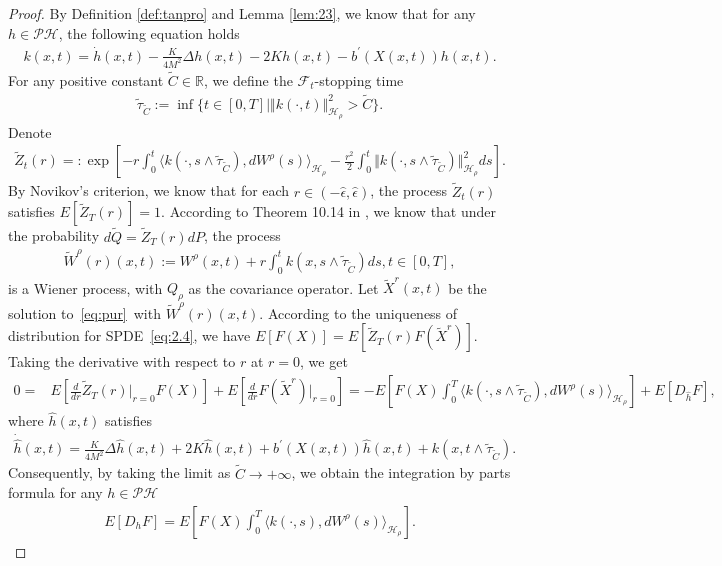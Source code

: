 \documentclass[11pt]{article}
\numberwithin{equation}{section}%
\numberwithin{figure}{section}%
\theoremstyle{remark}
\begin{document}
	\begin{proof}
		By Definition \ref{def:tanpro} and Lemma \ref{lem:23}, we know that for any $h\in\mathcal{PH}$, the following equation holds
		\begin{align*}
			k(x,t)=\dot{h}(x,t)-\frac{K}{4M^{2}}\Delta h(x,t)-2K h(x,t) -b^{\prime}(X(x,t))h(x,t).
		\end{align*}
		For any positive constant  $\tilde{C}\in\mathbb{R}$, we define the $\mathcal{F}_{t}$-stopping time
	\begin{align*}
		\tilde{\tau}_{\tilde{C}}:=\inf\{t\in[0,T]\mid\Vert k(\cdot,t)\Vert_{\mathcal{H}_{\rho}}^{2}> \tilde{C} \}.
	\end{align*}
	Denote 
	\begin{align*}
		\tilde{Z}_{t}(r)=:\exp\left[-r\int_{0}^{t}\langle k(\cdot,s\wedge\tilde{\tau}_{\tilde{C}}),dW^{\rho}(s)\rangle_{\mathcal{H}_{\rho}}-\frac{r^{2}}{2}\int_{0}^{t}\Vert k(\cdot,s\wedge\tilde{\tau}_{\tilde{C}})\Vert^{2}_{\mathcal{H}_{\rho}}ds\right].
	\end{align*}
	By Novikov’s criterion, we know that for each $r\in(-\hat{\epsilon},\hat{\epsilon})$, the process $\tilde{Z}_{t}(r)$ satisfies $E[\tilde{Z}_{T}(r)]=1$. According to Theorem 10.14 in \cite{Da2014book}, we know that under the probability $d\tilde{Q}=\tilde{Z}_{T}(r)dP$,
		 the process
		 \begin{align*}
		 	\tilde{W}^{\rho}(r)(x,t):=W^{\rho}(x,t)+r\int_{0}^{t}k(x,s\wedge\tilde{\tau}_{\tilde{C}})ds, t\in[0,T],
		 \end{align*}
		 is a Wiener process, with $Q_{\rho}$ as the covariance operator. Let $\tilde{X}^{r}(x,t)$ be the solution to~\eqref{eq:pur}~with $\tilde{W}^{\rho}(r)(x,t)$. According to the uniqueness of distribution for SPDE~\eqref{eq:2.4}, we have $E[F(X)]=E[\tilde{Z}_{T}(r)F(\tilde{X}^{r})]$. Taking the derivative with respect to $r$ at $r=0$, we get
		  \begin{align*}
		  0=&E[\frac{d}{dr}\tilde{Z}_{T}(r)|_{r=0}F(X)]+E[\frac{d}{dr}F(\tilde{X}^{r})|_{r=0}]
		  =-E[F(X)\int_{0}^{T}\langle k(\cdot,s\wedge\tilde{\tau}_{\tilde{C}}),dW^{\rho}(s)\rangle_{\mathcal{H}_{\rho}}]+E[D_{\hat{h}}F],
		  \end{align*}
		  where $\hat{h}(x,t)$ satisfies
		  \begin{align*}
		  	\dot{\hat{h}}(x,t)=\frac{K}{4M^{2}}\Delta \hat{h}(x,t)+2K \hat{h}(x,t) +b^{\prime}(X(x,t))\hat{h}(x,t)+k(x,t\wedge\tilde{\tau}_{\tilde{C}}).
		  \end{align*}
		  Consequently, by taking the limit as $\tilde{C}\rightarrow+\infty$, we obtain the integration by parts formula for any $h\in\mathcal{PH}$ 
		  \begin{align*}
		 	E[D_{h}F]=E[F(X)\int_{0}^{T}\langle k(\cdot,s),dW^{\rho}(s)\rangle_{\mathcal{H}_{\rho}}].
		 \end{align*}
	\end{proof}
\end{document}
